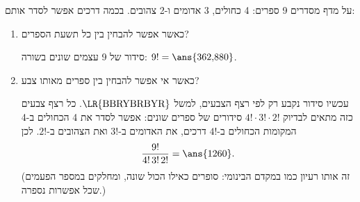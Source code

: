 על מדף מסדרים 9 ספרים: 4 כחולים, 3 אדומים ו-2 צהובים. בכמה דרכים אפשר לסדר אותם:
\begin{enumerate}
\item כאשר אפשר להבחין בין כל תשעת הספרים?
\begin{solbox}
סידור של 9 עצמים שונים בשורה: $9!=\ans{362{,}880}$.
\end{solbox}
\item כאשר אי אפשר להבחין בין ספרים מאותו צבע?
\begin{solbox}
עכשיו סידור נקבע רק לפי רצף הצבעים, למשל $\text{\LR{BBRYBRBYR}}$. כל רצף צבעים כזה מתאים לבדיוק $4!\cdot3!\cdot2!$ סידורים של ספרים שונים: אפשר לסדר את 4 הכחולים ב-4 המקומות הכחולים ב-$4!$ דרכים, את האדומים ב-$3!$ ואת הצהובים ב-$2!$. לכן
\[
\frac{9!}{4!\,3!\,2!}=\ans{1260}.
\]
(זה אותו רעיון כמו במקדם הבינומי: סופרים כאילו הכול שונה, ומחלקים במספר הפעמים שכל אפשרות נספרה.)
\end{solbox}
\end{enumerate}

